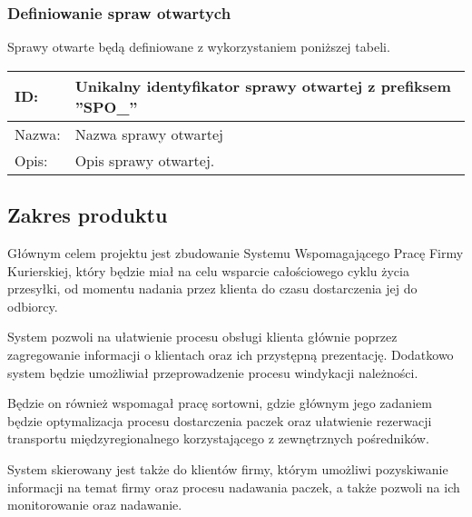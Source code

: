 \subsubsection*{Definiowanie spraw otwartych}
Sprawy otwarte będą definiowane z wykorzystaniem poniższej tabeli.

\begin{center}
\begin{tabular}[h]{|p{2cm}|p{13.1cm}|}
\hline
ID: & Unikalny identyfikator sprawy otwartej z prefiksem ''SPO\_'' \\ \hline
Nazwa: & Nazwa sprawy otwartej \\ \hline
Opis: & Opis sprawy otwartej. \\
\hline
\end{tabular}
\end{center}

\subsection{Zakres produktu}
Głównym celem projektu jest zbudowanie Systemu Wspomagającego Pracę Firmy Kurierskiej, który będzie miał na celu wsparcie całościowego cyklu życia przesyłki, od momentu nadania przez klienta do czasu dostarczenia jej do odbiorcy. 

System pozwoli na ułatwienie procesu obsługi klienta głównie poprzez zagregowanie informacji o klientach oraz ich przystępną prezentację. Dodatkowo system będzie umożliwiał przeprowadzenie procesu windykacji należności.

Będzie on również wspomagał pracę sortowni, gdzie głównym jego zadaniem będzie optymalizacja procesu dostarczenia paczek oraz ułatwienie rezerwacji transportu międzyregionalnego korzystającego z zewnętrznych pośredników.

System skierowany jest także do klientów firmy, którym umożliwi pozyskiwanie informacji na temat firmy oraz procesu nadawania paczek, a także pozwoli na ich monitorowanie oraz nadawanie.

%


